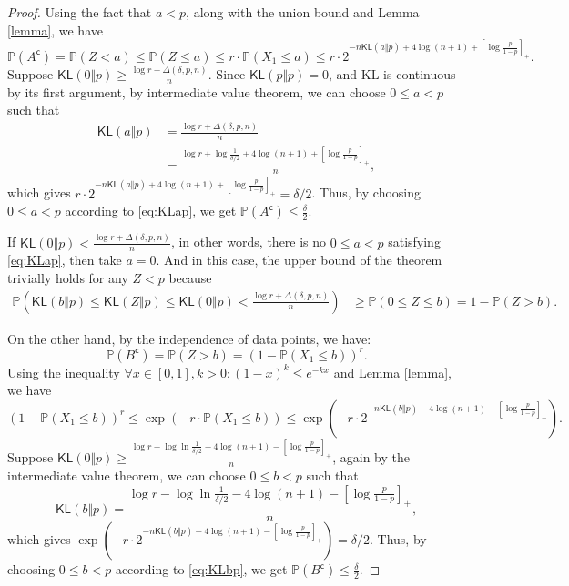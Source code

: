 \documentclass[12pt]{article}
\newcommand{\KL}{\textsf{KL}}
\newcommand{\comp}{\mathsf{c}}
\begin{document}
\begin{proof}
    Using the fact that $a<p$, along with the union bound and Lemma \ref{lemma}, we have 
    \[
    \mathbb{P}(A^\comp) =\mathbb{P}(Z < a) \leq \mathbb{P}(Z \leq a) \leq r \cdot\mathbb{P}(X_1 \leq a) \leq r \cdot 2^{-n\KL(a\Vert p) + 4\log (n+1) + \left[ \log \frac{p}{1-p} \right]_+}.
    \]
    Suppose $\KL(0\Vert p) \geq \frac{\log r + \Delta(\delta, p, n)}{n}$. Since $\KL(p\Vert p) = 0$, and KL is continuous by its first argument, by intermediate value theorem, we can choose $0 \leq a <p$ such that
    \begin{equation} \label{eq:KLap} 
    \begin{split}
    \KL(a\Vert p)  &= \frac{\log r + \Delta(\delta, p, n)}{n}\\
    &= \frac{\log r + \log \frac{1}{\delta/2} + 4\log (n+1) + \left[ \log \frac{p}{1-p} \right]_+}{n},
    \end{split}
    \end{equation}
     which gives $r \cdot 2^{-n\KL(a\Vert p) + 4\log (n+1) + \left[ \log \frac{p}{1-p} \right]_+}=\delta/2$.
    Thus, by choosing $0 \leq a < p$ according to \eqref{eq:KLap}, we get $\mathbb{P}(A^\comp) \leq \frac{\delta}{2}$.
    
    If $\KL(0\Vert p) < \frac{\log r + \Delta(\delta, p, n)}{n}$, in other words, there is no $0 \leq a < p$ satisfying \eqref{eq:KLap}, then take $a = 0$. And in this case, the upper bound of the theorem trivially holds for any $Z < p$ because
    \begin{align*}
        \mathbb{P}\left(\KL(b \Vert p) \leq \KL(Z\Vert p) \leq \KL(0 \Vert p) < \frac{\log r + \Delta(\delta, p, n)}{n}\right) &\geq \mathbb{P}(0 \leq Z \leq b)
        = 1 - \mathbb{P}(Z > b).
    \end{align*}

    On the other hand, by the independence of data points, we have:
    \begin{equation}\label{eq:indep}
    \mathbb{P}(B^\comp) = \mathbb{P}(Z > b) = (1-\mathbb{P}(X_1 \leq b))^r.
    \end{equation}
    Using the inequality $\forall x \in [0,1], k > 0: (1-x)^k \leq e^{-kx}$ and Lemma \ref{lemma}, we have
    \begin{equation}\label{eq:expbd}
    (1-\mathbb{P}(X_1 \leq b))^r \leq \exp\left(-r \cdot \mathbb{P}(X_1 \leq b)\right) \leq \exp \left(-r \cdot 2^{-n\KL(b\Vert p) - 4\log (n+1) - \left[ \log \frac{p}{1-p} \right]_+}\right).
    \end{equation}
    Suppose $\KL(0\Vert p) \geq \frac{\log r - \log \ln \frac{1}{\delta/2} - 4\log (n+1) - \left[ \log \frac{p}{1-p} \right]_+}{n}$, again by the intermediate value theorem, we can choose $0 \leq b < p$ such that 
    \begin{equation} \label{eq:KLbp}
    \KL(b\Vert p) = \frac{\log r - \log \ln \frac{1}{\delta/2} - 4\log (n+1) - \left[ \log \frac{p}{1-p} \right]_+}{n}, 
    \end{equation}
    which gives $\exp \left(-r \cdot 2^{-n\KL(b\Vert p) - 4\log (n+1) - \left[ \log \frac{p}{1-p} \right]_+}\right) = \delta/2$.
    Thus, by choosing $0 \leq b <p$ according to \eqref{eq:KLbp}, we get $\mathbb{P}(B^\comp) \leq \frac{\delta}{2}$.


\end{proof}
\end{document}
